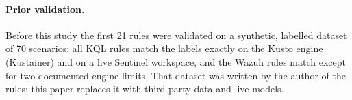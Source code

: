 \paragraph{Prior validation.}
Before this study the first 21 rules were validated on a synthetic, labelled dataset of 70 scenarios:
all KQL rules match the labels exactly on the Kusto engine (Kustainer) and on a live Sentinel
workspace, and the Wazuh rules match except for two documented engine limits. That dataset was
written by the author of the rules; this paper replaces it with third-party data and live models.
